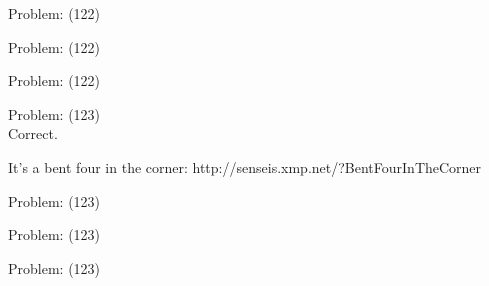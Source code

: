 \documentclass[11pt]{article}
\begin{document}
\begin{minipage}[t]{0.5\textwidth}
  {\centering
  
  Problem: (122)\\
  
  }
\end{minipage}
\begin{minipage}[t]{0.5\textwidth}
  {\centering
  
  Problem: (122)\\
  
  }
\end{minipage}
\begin{minipage}[t]{0.5\textwidth}
  {\centering
  
  Problem: (122)\\
  
  }
\end{minipage}
\begin{minipage}[t]{0.5\textwidth}
  {\centering
  
  Problem: (123)\\
  Correct.

It's a bent four in the corner: http://senseis.xmp.net/?BentFourInTheCorner\\
  }
\end{minipage}
\begin{minipage}[t]{0.5\textwidth}
  {\centering
  
  Problem: (123)\\
  
  }
\end{minipage}
\begin{minipage}[t]{0.5\textwidth}
  {\centering
  
  Problem: (123)\\
  
  }
\end{minipage}
\begin{minipage}[t]{0.5\textwidth}
  {\centering
  
  Problem: (123)\\
  
  }
\end{minipage}
\end{document}
